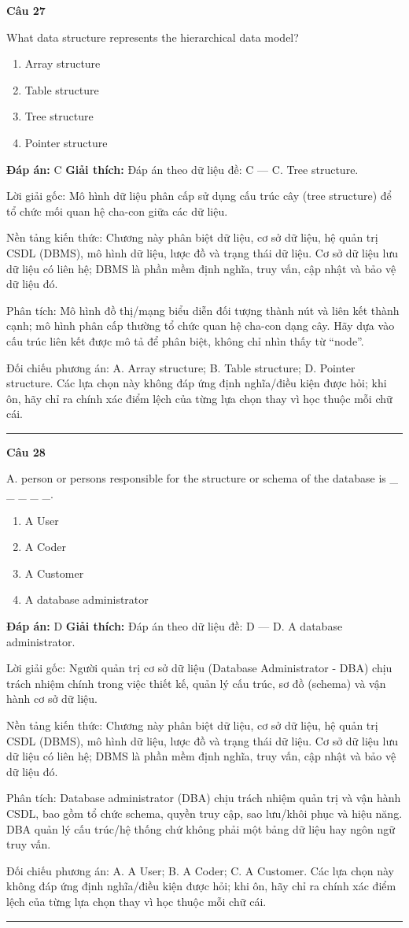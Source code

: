 \documentclass[11pt,a4paper]{article}
\newenvironment{question}[1]{%
  \par\vspace{1em}\noindent\textbf{\large Câu #1}\par\vspace{0.4em}
}{%
  \par\vspace{1em}\hrule\vspace{0.6em}
}
\newenvironment{choices}{%
  \begin{enumerate}[label=\textbf{\Alph*.},leftmargin=2.2em,itemsep=2pt,topsep=3pt]
}{%
  \end{enumerate}
}
\newcommand{\choice}{\item}
\begin{document}
\begin{question}{27}
What data structure represents the hierarchical data model?
\begin{choices}
\choice Array structure
\choice Table structure
\choice Tree structure
\choice Pointer structure
\end{choices}
\textbf{Đáp án:} C
\textbf{Giải thích:} Đáp án theo dữ liệu đề: C — C. Tree structure.

Lời giải gốc: Mô hình dữ liệu phân cấp sử dụng cấu trúc cây (tree structure) để tổ chức mối quan hệ cha-con giữa các dữ liệu.

Nền tảng kiến thức: Chương này phân biệt dữ liệu, cơ sở dữ liệu, hệ quản trị CSDL (DBMS), mô hình dữ liệu, lược đồ và trạng thái dữ liệu. Cơ sở dữ liệu lưu dữ liệu có liên hệ; DBMS là phần mềm định nghĩa, truy vấn, cập nhật và bảo vệ dữ liệu đó.

Phân tích: Mô hình đồ thị/mạng biểu diễn đối tượng thành nút và liên kết thành cạnh; mô hình phân cấp thường tổ chức quan hệ cha-con dạng cây. Hãy dựa vào cấu trúc liên kết được mô tả để phân biệt, không chỉ nhìn thấy từ “node”.

Đối chiếu phương án: A. Array structure; B. Table structure; D. Pointer structure. Các lựa chọn này không đáp ứng định nghĩa/điều kiện được hỏi; khi ôn, hãy chỉ ra chính xác điểm lệch của từng lựa chọn thay vì học thuộc mỗi chữ cái.
\end{question}


\begin{question}{28}
A. person or persons responsible for the structure or schema of the database is _ _ _ _ _.
\begin{choices}
\choice A User
\choice A Coder
\choice A Customer
\choice A database administrator
\end{choices}
\textbf{Đáp án:} D
\textbf{Giải thích:} Đáp án theo dữ liệu đề: D — D. A database administrator.

Lời giải gốc: Người quản trị cơ sở dữ liệu (Database Administrator - DBA) chịu trách nhiệm chính trong việc thiết kế, quản lý cấu trúc, sơ đồ (schema) và vận hành cơ sở dữ liệu.

Nền tảng kiến thức: Chương này phân biệt dữ liệu, cơ sở dữ liệu, hệ quản trị CSDL (DBMS), mô hình dữ liệu, lược đồ và trạng thái dữ liệu. Cơ sở dữ liệu lưu dữ liệu có liên hệ; DBMS là phần mềm định nghĩa, truy vấn, cập nhật và bảo vệ dữ liệu đó.

Phân tích: Database administrator (DBA) chịu trách nhiệm quản trị và vận hành CSDL, bao gồm tổ chức schema, quyền truy cập, sao lưu/khôi phục và hiệu năng. DBA quản lý cấu trúc/hệ thống chứ không phải một bảng dữ liệu hay ngôn ngữ truy vấn.

Đối chiếu phương án: A. A User; B. A Coder; C. A Customer. Các lựa chọn này không đáp ứng định nghĩa/điều kiện được hỏi; khi ôn, hãy chỉ ra chính xác điểm lệch của từng lựa chọn thay vì học thuộc mỗi chữ cái.
\end{question}
\end{document}
